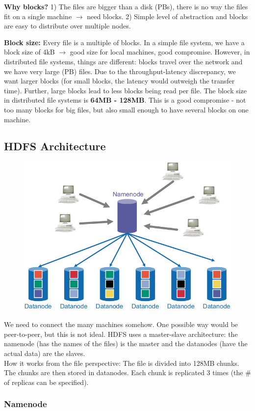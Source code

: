 \documentclass[11pt,oneside,a4paper]{article}
\begin{document}
\textbf{Why blocks?} 1) The files are bigger than a disk (PBs), there is no way the files fit on a single machine $\rightarrow$ need blocks. 2) Simple level of abstraction and blocks are easy to distribute over multiple nodes.

\textbf{Block size:} Every file is a multiple of blocks. In a simple file system, we have a block size of 4kB $\rightarrow$ good size for local machines, good compromise. However, in distributed file systems, things are different: blocks travel over the network and we have very large (PB) files. Due to the throughput-latency discrepancy, we want larger blocks (for small blocks, the latency would outweigh the transfer time). Further, large blocks lead to less blocks being read per file. The block size in distributed file systems is \textbf{64MB - 128MB}. This is a good compromise - not too many blocks for big files, but also small enough to have several blocks on one machine.\\

\subsection{HDFS Architecture}

\begin{figure}[hb!]
	\centering
	\includegraphics[width=0.3\linewidth]{figures/hdfs_architecture}
	\label{fig:hdfsarchitecture}
\end{figure}


We need to connect the many machines somehow. One possible way would be peer-to-peer, but this is not ideal. HDFS uses a master-slave architecture: the namenode (has the names of the files) is the master and the datanodes (have the actual data) are the slaves.\\
How it works from the file perspective: The file is divided into 128MB chunks. The chunks are then stored in datanodes. Each chunk is replicated 3 times (the \# of replicas can be specified).

\subsubsection{Namenode}
\end{document}
